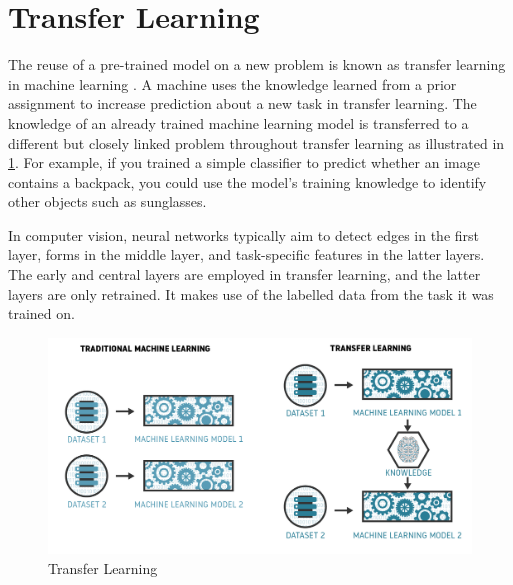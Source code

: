 \section{Transfer Learning}
The reuse of a pre-trained model on a new problem is known as transfer learning in machine learning \cite{transfer_learning}. A machine uses the knowledge learned from a prior assignment to increase prediction about a new task in transfer learning. The knowledge of an already trained machine learning model is transferred to a different but closely linked problem throughout transfer learning as illustrated in \ref{fig: transferLearning}. For example, if you trained a simple classifier to predict whether an image contains a backpack, you could use the model’s training knowledge to identify other objects such as sunglasses. \newline

In computer vision, neural networks typically aim to detect edges in the first layer, forms in the middle layer, and task-specific features in the latter layers. The early and central layers are employed in transfer learning, and the latter layers are only retrained. It makes use of the labelled data from the task it was trained on.

\begin{figure}[H]
\centering
\includegraphics[width=\textwidth]{imgs/transferlearning.jpg}
\caption{Transfer Learning}
\label{fig: transferLearning}
\end{figure}

